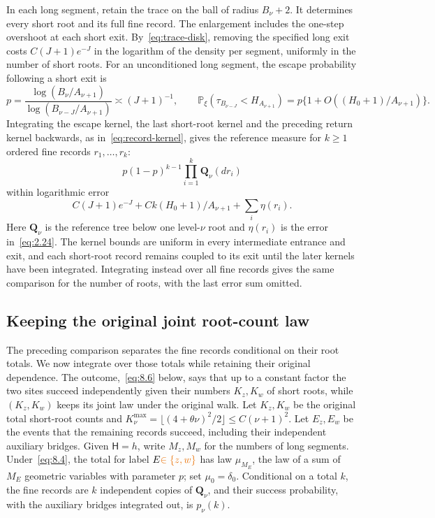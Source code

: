 \documentclass[11pt,letterpaper,reqno]{amsart}
\newif\ifrevmarks \revmarkstrue
\newcommand{\add}[1]{\ifrevmarks\textcolor{revorange}{#1}\else#1\fi}
\numberwithin{equation}{section}
\theoremstyle{remark}
\begin{document}
In each long segment, retain the trace on the ball of radius $B_\nu+2$. It determines every short root and its full fine record. The enlargement includes the one-step overshoot at each short exit. By~\eqref{eq:trace-disk}, removing the specified long exit costs $C(J+1)e^{-J}$ in the logarithm of the density per segment, uniformly in the number of short roots. For an unconditioned long segment, the escape probability following a short exit is
\begin{equation}\label{eq:8.1}
 p=\frac{\log(B_\nu/A_{\nu+1})}{\log(B_{\nu-J}/A_{\nu+1})}
 \asymp(J+1)^{-1},\qquad
 \mathbb P_\xi(\tau_{B_{\nu-J}}<H_{A_{\nu+1}})
 =p\{1+O((H_0+1)/A_{\nu+1})\}.
\end{equation}
Integrating the escape kernel, the last short-root kernel and the preceding return kernel backwards, as in~\eqref{eq:record-kernel}, gives the reference measure for $k\ge1$ ordered fine records $r_1,\ldots,r_k$:
\begin{equation}\label{eq:8.4}
 p(1-p)^{k-1}\prod_{i=1}^k\mathbf Q_\nu(dr_i)
\end{equation}
within logarithmic error
\[
 C(J+1)e^{-J}+Ck(H_0+1)/A_{\nu+1}+\sum_i\eta(r_i).
\]
Here $\mathbf Q_\nu$ is the reference tree below one level-$\nu$ root and $\eta(r_i)$ is the error in~\eqref{eq:2.24}. The kernel bounds are uniform in every intermediate entrance and exit, and each short-root record remains coupled to its exit until the later kernels have been integrated. Integrating instead over all fine records gives the same comparison for the number of roots, with the last error sum omitted.

\subsection{Keeping the original joint root-count law}\label{sec:jointroots}
The preceding comparison separates the fine records conditional on their root totals. We now integrate over those totals while retaining their original dependence. \add{The outcome,~\eqref{eq:8.6} below, says that up to a constant factor the two sites succeed independently given their numbers $K_z,K_w$ of short roots, while $(K_z,K_w)$ keeps its joint law under the original walk.} Let $K_z,K_w$ be the original total short-root counts and
$K_\nu^{\max}=\lfloor(4+\theta\nu)^2/2\rfloor\le C(\nu+1)^2$.
Let $E_z,E_w$ be the events that the remaining records succeed, including their independent auxiliary bridges. Given $\mathsf H=h$, write $M_z,M_w$ for the numbers of long segments. Under~\eqref{eq:8.4}, the total for label $E\add{\in\{z,w\}}$ has law $\mu_{M_E}$, the law of a sum of $M_E$ geometric variables with parameter $p$; set $\mu_0=\delta_0$. Conditional on a total $k$, the fine records are $k$ independent copies of $\mathbf Q_\nu$, and their success probability, with the auxiliary bridges integrated out, is $p_\nu(k)$.
\end{document}
